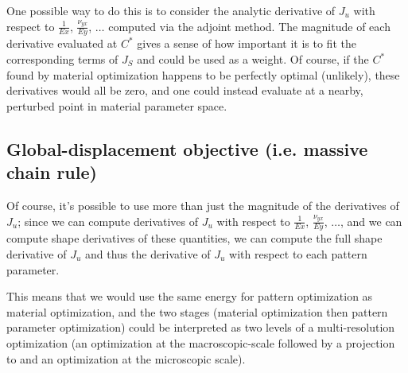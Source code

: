 \documentclass[10pt]{article}
\begin{document}
One possible way to do this is to consider the analytic derivative of $J_u$
with respect to $\frac{1}{Ex}$, $\frac{\nu_{yx}}{Ey}$, $\dots$ computed via the
adjoint method. The magnitude of each derivative evaluated at $C^*$ gives a sense
of how important it is to fit the corresponding terms of $J_S$ and could be used as a
weight. Of course, if the $C^*$ found by material optimization happens to be
perfectly optimal (unlikely), these derivatives would all be zero, and one could
instead evaluate at a nearby, perturbed point in material parameter space.

\subsection{Global-displacement objective (i.e. massive chain rule)}
\label{sec:chain_rule}
Of course, it's possible to use more than just the magnitude of the derivatives
of $J_u$; since we can compute derivatives of $J_u$ with respect to
$\frac{1}{Ex}$, $\frac{\nu_{yx}}{Ey}$, $\dots$, and we can compute shape
derivatives of these quantities, we can compute the full shape derivative of
$J_u$ and thus the derivative of $J_u$ with respect to each pattern parameter.

This means that we would use the same energy for pattern optimization as material
optimization, and the two stages (material optimization then pattern parameter
optimization) could be interpreted as two levels of a multi-resolution optimization
(an optimization at the macroscopic-scale followed by a projection to and an
optimization at the microscopic scale).
\end{document}
